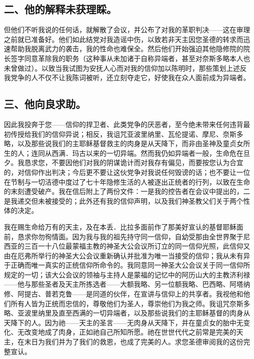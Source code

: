 
\subsection{二、他的解释未获理睬。}

但他们不听我说的任何话，就解散了会议，并公布了对我的革职判决——这在审理之前就已准备好。他们如此结党对我造谣中伤，以致若非天主因您圣德的转求而迅速帮助我脱离武力的袭击，我的性命也难保全。然后他们开始强迫其他隐修院的院长签字同意革除我的职务（这种事从未加诸于自称异端者，甚至对奈斯多略本人也未曾做过）。以致当我试图为安抚人心而对我的信仰加以陈明时，那些策划上述反我党争的人不仅不让我陈词被听，还立刻夺走它，好使我在众人面前成为异端者。\par


\subsection{三、他向良求助。}

因此我投奔于您——信仰的捍卫者、此类党争的厌恶者，至今绝未带来任何违背最初传授给我们的信仰异说；相反，我诅咒亚波里纳里、瓦伦提诺、摩尼、奈斯多略，以及那些说我们的主耶稣基督救主的肉身是从天降下，而非由圣神及童贞女所生的人；连同从西满．玛古以来的一切异端。然而我仍如异端者一般，生命危在旦夕。我恳求您，不要因他们对我的阴谋诡计而对我存有偏见，而要按您认为合宜的，对信仰作出判决；今后更不要让这伙党争对我说任何毁谤的话；也不要让一位在节制与一切洁德中度过了七十年隐修生活的人被逐出正统者的行列，以致在生命的末刻遭受破产。我在信后附上了两份文件：一是我的控告者在会议中提出的，二是我递交但未被接受的；此外还有我的信仰声明，以及我们神圣教父们关于两个性体的决定。\par

\par

我在赐生命给万有的天主，及在本丢．比拉多面前作了那美好宣认的基督耶稣面前，恳求你勿徇情面。因为我与我的祖先持守同一信仰，自幼受那由全世界聚于尼西亚的三百一十八位最蒙福主教的神圣大公会议所订立的同一信仰光照，此信仰又由在厄弗所举行的神圣大公会议重新确认并批准为唯一当接受的信仰；我从未有异于正确而唯一真实的正统信仰所命令的。我同意同一神圣大公会议关于同一信仰所规定的一切；该大公会议的领袖与主持人是蒙福的记忆中的阿历山大的主教济利禄——他与那些圣者及天主所拣选者——大额我略、另一位额我略、巴西略、阿塔纳修、阿提古、普若克鲁——是同道的伙伴，在宣讲与信仰上的共享者。我视他和他们所有人皆为正统而忠信的，尊敬他们为圣人，尊崇他们为我之师。我诅咒奈斯多略、亚波里纳里及直至西满的一切异端者，以及那些说我们的主耶稣基督的肉身从天降下的人。因为祂——天主的圣言——无肉身从天降下，并在童贞女的胎中无变化、无改变地成了肉身，正如祂自己所知所愿。祂在世世代代之前常是完美的天主，在末日为我们并为了我们的救恩，也成了完美的人。求您圣德审阅我的这份完整宣认。\par

